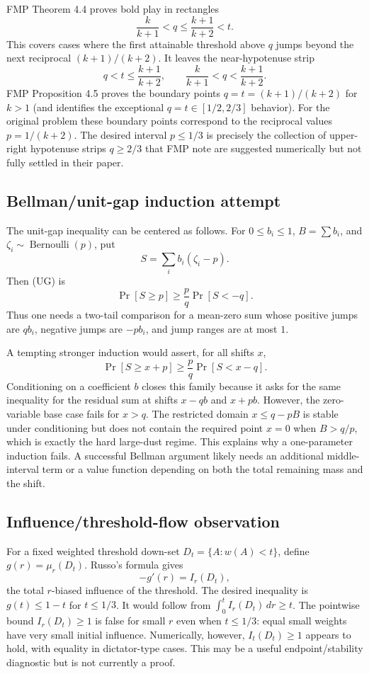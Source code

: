 \documentclass[12pt]{article}
\newcommand{\Ber}{\operatorname{Bernoulli}}
\begin{document}
FMP Theorem 4.4 proves bold play in rectangles
\[
 \frac{k}{k+1}<q\le \frac{k+1}{k+2}<t.
\]
This covers cases where the first attainable threshold above \(q\) jumps beyond
the next reciprocal \((k+1)/(k+2)\).  It leaves the near-hypotenuse strip
\[
 q<t\le \frac{k+1}{k+2},\qquad \frac{k}{k+1}<q<\frac{k+1}{k+2}.
\]
FMP Proposition 4.5 proves the boundary points
\(q=t=(k+1)/(k+2)\) for \(k>1\) (and identifies the exceptional
\(q=t\in[1/2,2/3]\) behavior).  For the original problem these boundary points
correspond to the reciprocal values \(p=1/(k+2)\).  The desired interval
\(p\le1/3\) is precisely the collection of upper-right hypotenuse strips
\(q\ge2/3\) that FMP note are suggested numerically but not fully settled in
their paper.

\subsection*{Bellman/unit-gap induction attempt}

The unit-gap inequality can be centered as follows.  For \(0\le b_i\le1\),
\(B=\sum b_i\), and \(\zeta_i\sim\Ber(p)\), put
\[
 S=\sum_i b_i(\zeta_i-p).
\]
Then (UG) is
\[
 \Pr[S\ge p]\ge \frac pq \Pr[S<-q].
\]
Thus one needs a two-tail comparison for a mean-zero sum whose positive jumps
are \(qb_i\), negative jumps are \(-pb_i\), and jump ranges are at most \(1\).

A tempting stronger induction would assert, for all shifts \(x\),
\[
 \Pr[S\ge x+p]\ge \frac pq\Pr[S<x-q].
\]
Conditioning on a coefficient \(b\) closes this family because it asks for the
same inequality for the residual sum at shifts \(x-qb\) and \(x+pb\).  However,
the zero-variable base case fails for \(x>q\).  The restricted domain
\(x\le q-pB\) is stable under conditioning but does not contain the required
point \(x=0\) when \(B>q/p\), which is exactly the hard large-dust regime.
This explains why a one-parameter induction fails.  A successful Bellman
argument likely needs an additional middle-interval term or a value function
depending on both the total remaining mass and the shift.

\subsection*{Influence/threshold-flow observation}

For a fixed weighted threshold down-set
\(D_t=\{A:w(A)<t\}\), define \(g(r)=\mu_r(D_t)\).  Russo's formula gives
\[
 -g'(r)=I_r(D_t),
\]
the total \(r\)-biased influence of the threshold.  The desired inequality is
\(g(t)\le1-t\) for \(t\le1/3\).  It would follow from
\(\int_0^t I_r(D_t)\,dr\ge t\).  The pointwise bound
\(I_r(D_t)\ge1\) is false for small \(r\) even when \(t\le1/3\): equal small
weights have very small initial influence.  Numerically, however,
\(I_t(D_t)\ge1\) appears to hold, with equality in dictator-type cases.  This
may be a useful endpoint/stability diagnostic but is not currently a proof.
\end{document}
